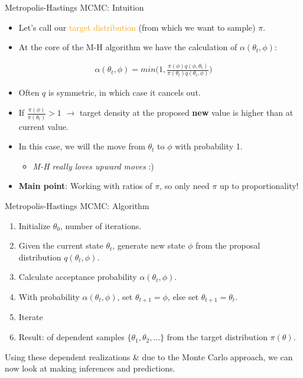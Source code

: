 \documentclass[ignorenonframetext,]{beamer}
\providecommand{\tightlist}{%
  \setlength{\itemsep}{0pt}\setlength{\parskip}{0pt}}
\newcommand{\HIGHLIGHT}[1]{\noindent{\color{blue}#1}}
\newcommand{\orange}[1]{\textcolor{orange}{#1}}
\begin{document}
\begin{frame}{Metropolis-Hastings MCMC: Intuition}

\begin{itemize}
\tightlist
\item
  Let's call our \orange{target distribution} (from which we want to
  sample) \(\pi\).
\item
  At the core of the M-H algorithm we have the calculation of
  \(\alpha(\theta_t, \phi)\):
\end{itemize}

\[
\begin{aligned}
\alpha(\theta_t, \phi) = min \Big( 1, \frac{\pi(\phi) q(\phi, \theta_t)}{\pi(\theta_t) q(\theta_t, \phi)} \Big)
\end{aligned}
\]

\begin{itemize}
\tightlist
\item
  Often \(q\) is symmetric, in which case it cancels out.
\item
  If \(\frac{\pi(\phi)}{\pi({\theta_t})} > 1\) \(\rightarrow\) target
  density at the proposed \textbf{new} value is higher than at current
  value.
\item
  In this case, we will \HIGHLIGHT{accept} the move from \(\theta_t\) to
  \(\phi\) with probability 1.

  \begin{itemize}
  \tightlist
  \item
    \emph{M-H really loves upward moves} :)
  \end{itemize}
\item
  \textbf{Main point}: Working with ratios of \(\pi\), so only need
  \(\pi\) up to proportionality!
\end{itemize}

\end{frame}

\begin{frame}{Metropolis-Hastings MCMC: Algorithm}

\begin{enumerate}
\def\labelenumi{\arabic{enumi}.}
\tightlist
\item
  Initialize \(\theta_0\), number of iterations.
\item
  Given the current state \(\theta_t\), generate new state \(\phi\) from
  the proposal distribution \(q(\theta_t, \phi)\).
\item
  Calculate acceptance probability \(\alpha(\theta_t, \phi)\).
\item
  With probability \(\alpha(\theta_t, \phi)\), set
  \(\theta_{t + 1} = \phi\), else set \(\theta_{t + 1} = \theta_t\).
\item
  Iterate
\item
  Result: \HIGHLIGHT{Realizations} of dependent samples
  \(\{\theta_1, \theta_2, ...\}\) from the target distribution
  \(\pi(\theta)\).
\end{enumerate}

Using these dependent realizations \& due to the Monte Carlo approach,
we can now look at making inferences and predictions.

\end{frame}
\end{document}
